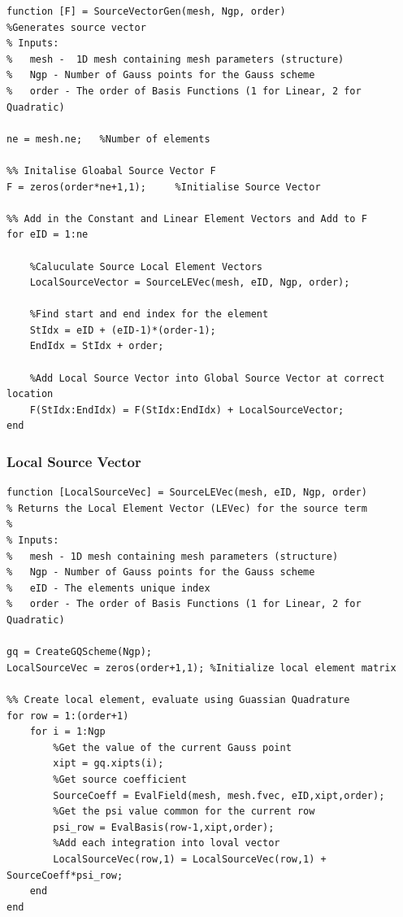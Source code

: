 \documentclass[11pt]{article}
\begin{document}
\begin{appendices}
\begin{lstlisting}
function [F] = SourceVectorGen(mesh, Ngp, order)
%Generates source vector
% Inputs:
%   mesh -  1D mesh containing mesh parameters (structure)
%   Ngp - Number of Gauss points for the Gauss scheme
%   order - The order of Basis Functions (1 for Linear, 2 for Quadratic)

ne = mesh.ne;   %Number of elements

%% Initalise Gloabal Source Vector F
F = zeros(order*ne+1,1);     %Initialise Source Vector

%% Add in the Constant and Linear Element Vectors and Add to F
for eID = 1:ne
    
    %Caluculate Source Local Element Vectors
    LocalSourceVector = SourceLEVec(mesh, eID, Ngp, order);
    
    %Find start and end index for the element
    StIdx = eID + (eID-1)*(order-1);
    EndIdx = StIdx + order;
    
    %Add Local Source Vector into Global Source Vector at correct location
    F(StIdx:EndIdx) = F(StIdx:EndIdx) + LocalSourceVector;
end

\end{lstlisting}
\pagebreak

\subsubsection{Local Source Vector}\label{ap:SLEV}

\begin{lstlisting}
function [LocalSourceVec] = SourceLEVec(mesh, eID, Ngp, order)
% Returns the Local Element Vector (LEVec) for the source term
%
% Inputs:
%   mesh - 1D mesh containing mesh parameters (structure)
%   Ngp - Number of Gauss points for the Gauss scheme 
%   eID - The elements unique index
%   order - The order of Basis Functions (1 for Linear, 2 for Quadratic)

gq = CreateGQScheme(Ngp);
LocalSourceVec = zeros(order+1,1); %Initialize local element matrix

%% Create local element, evaluate using Guassian Quadrature
for row = 1:(order+1)
    for i = 1:Ngp
        %Get the value of the current Gauss point
        xipt = gq.xipts(i);
        %Get source coefficient
        SourceCoeff = EvalField(mesh, mesh.fvec, eID,xipt,order);
        %Get the psi value common for the current row
        psi_row = EvalBasis(row-1,xipt,order);
        %Add each integration into loval vector
        LocalSourceVec(row,1) = LocalSourceVec(row,1) + SourceCoeff*psi_row;
    end
end


\end{lstlisting}
\end{appendices}
\end{document}
